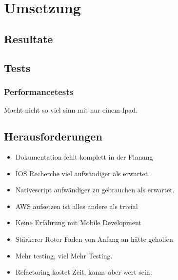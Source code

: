 \section{Umsetzung}\label{sec:umsetzung}

    \subsection{Resultate}

        
        
        
        

    \subsection{Tests}

        
        





\subsubsection*{Performancetests}
Macht nicht so viel sinn mit nur einem Ipad.

\clearpage
\subsection{Herausforderungen}
\begin{itemize}
    \item Dokumentation fehlt komplett in der Planung
    \item IOS Recherche viel aufwändiger als erwartet.
    \item Nativescript aufwändiger zu gebrauchen als erwartet.
    \item AWS aufsetzen ist alles andere als trivial
    \item Keine Erfahrung mit Mobile Development
    \item Stärkerer Roter Faden von Anfang an hätte geholfen
    \item Mehr testing, viel Mehr Testing.
    \item Refactoring kostet Zeit, kanns aber wert sein.
\end{itemize}

